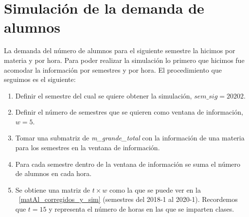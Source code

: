 \section{Simulación de la demanda de alumnos} \label{SimDemandaAlumnos}

La demanda del número de alumnos para el siguiente semestre la hicimos por materia y por hora. Para poder realizar la simulación lo primero que hicimos fue acomodar la información por semestres y por hora. El procedimiento que seguimos es el siguiente:
  
  \begin{enumerate}
\item Definir el semestre del cual se quiere obtener la simulación, $sem\_sig = 20202$.

\item Definir el número de semestres que se quieren como ventana de información, $w = 5$.

\item Tomar una submatriz de \textit{m\_grande\_total} con la información de una materia para los semestres en la ventana de información.

\item Para cada semestre dentro de la ventana de información se suma el número de alumnos en cada hora.

\item Se obtiene una matriz de $t \times w$ como la que se puede ver en la \figurename{~\ref{matAl_corregidos_y_sim}} (semestres del 2018-1 al 2020-1). Recordemos que $t = 15$ y representa el número de horas en las que se imparten clases.
\end{enumerate}



